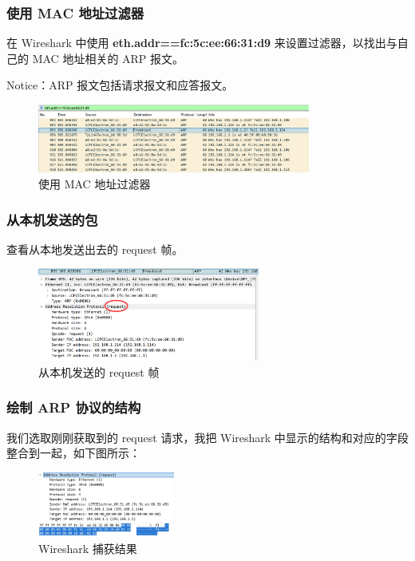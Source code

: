 \documentclass[14pt,a4paper,UTF8,twoside]{article}
\begin{document}
\subsubsection{使用 MAC 地址过滤器}

在 Wireshark 中使用 \textbf{eth.addr==fc:5c:ee:66:31:d9} 来设置过滤器，以找出与自己的 MAC 地址相关的 ARP 报文。

Notice：ARP 报文包括请求报文和应答报文。

\begin{figure}[H]
    \centering
    \includegraphics[width=0.8\textwidth]{lab4/macfilter.png}
    \caption{使用 MAC 地址过滤器}
\end{figure}

\subsubsection{从本机发送的包}

查看从本地发送出去的 request 帧。

\begin{figure}[H]
    \centering
    \includegraphics[width=0.65\textwidth]{lab4/request.png}
    \caption{从本机发送的 request 帧}
\end{figure}

\subsubsection{绘制 ARP 协议的结构}

我们选取刚刚获取到的 request 请求，我把 Wireshark 中显示的结构和对应的字段整合到一起，如下图所示：

\begin{figure}[H]
    \centering
    \includegraphics[width=0.4\textwidth]{lab4/example.jpg}
    \caption{Wireshark 捕获结果}
\end{figure}
\end{document}
